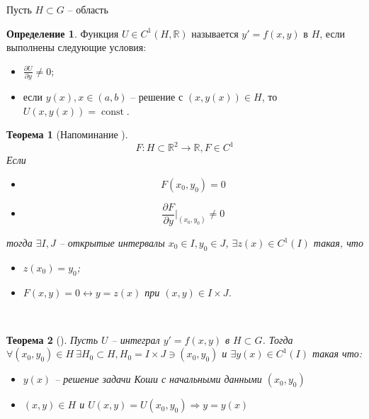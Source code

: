 \documentclass[a4paper]{article}
\theoremstyle{indented}
\newtheorem*{theorem}{Теорема}
\theoremstyle{definition}
\newtheorem*{defn}{Определение}
\theoremstyle{remark}
\DeclareMathOperator{\const}{const}
\begin{document}
Пусть $H \subset G$ -- область
\begin{defn}
  Функция $U \in C^1(H,\mathbb{R})$ называется  $y' = f(x,y)$ в $H$, если выполнены следующие условия:
  \begin{itemize}
  \item $\frac{\partial U}{\partial y} \not = 0$;
  \item если $y(x), x \in (a,b)$ -- решение с $(x,y(x)) \in H$, то $U(x,y(x)) = \const$.
  \end{itemize}
\end{defn}

\begin{theorem}[Напоминание ]

  \[F : H \subset \mathbb{R}^2 \to \mathbb{R}, F \in C^1  \]
  Если
  \begin{itemize}
    \item
      \[F(x_0,y_0) = 0\]
    \item
      \[ \frac{\partial F}{\partial y}\bigg|_{(x_0,y_0)} \not  = 0\]
  \end{itemize}

  тогда $\exists I, J$ -- открытые интервалы $x_0 \in I, y_0 \in J$, $\exists z(x) \in C^1(I)$ такая, что
  \begin{itemize}
  \item $z(x_0) = y_0$;
  \item $F(x,y) = 0 \leftrightarrow y = z(x)$ при $(x,y) \in I \times J$.
  \end{itemize}
\end{theorem} \ 

\begin{theorem}[]

  Пусть $U$ -- интеграл $y' = f(x,y)$ в $H \subset G$. Тогда $\forall (x_0,y_0) \in H \ \exists H_0 \subset H, H_0 = I \times J \ni (x_0,y_0)$ и $\exists y(x) \in C^1(I)$ такая что:

  \begin{itemize}
    \item $y(x)$ -- решение задачи Коши с начальными данными $(x_0,y_0)$
    \item $(x,y) \in  H$ и $U(x,y) = U(x_0,y_0) \Rightarrow y = y(x)$
  \end{itemize}

\end{theorem}
\end{document}
